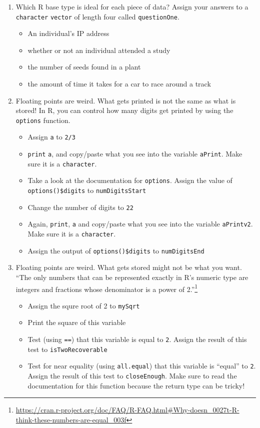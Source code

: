 \documentclass[
  12pt,
  krantz2]{krantz}
\providecommand{\tightlist}{%
  \setlength{\itemsep}{0pt}\setlength{\parskip}{0pt}}
\renewcommand{\href}[2]{#2\footnote{\url{#1}}}
\begin{document}
\begin{enumerate}
\def\labelenumi{\arabic{enumi}.}
\item
  Which R base type is ideal for each piece of data? Assign your answers to a \texttt{character} \texttt{vector} of length four called \texttt{questionOne}.

  \begin{itemize}
  \tightlist
  \item
    An individual's IP address
  \item
    whether or not an individual attended a study
  \item
    the number of seeds found in a plant
  \item
    the amount of time it takes for a car to race around a track
  \end{itemize}
\item
  Floating points are weird. What gets printed is not the same as what is stored! In R, you can control how many digits get printed by using the \texttt{options} function.

  \begin{itemize}
  \tightlist
  \item
    Assign \texttt{a} to \texttt{2/3}
  \item
    \texttt{print} \texttt{a}, and copy/paste what you see into the variable \texttt{aPrint}. Make sure it is a \texttt{character}.
  \item
    Take a look at the documentation for \texttt{options}. Assign the value of \texttt{options()\$digits} to \texttt{numDigitsStart}
  \item
    Change the number of digits to \texttt{22}
  \item
    Again, \texttt{print}, \texttt{a} and copy/paste what you see into the variable \texttt{aPrintv2}. Make sure it is a \texttt{character}.
  \item
    Assign the output of \texttt{options()\$digits} to \texttt{numDigitsEnd}
  \end{itemize}
\item
  Floating points are weird. What gets stored might not be what you want. \href{https://cran.r-project.org/doc/FAQ/R-FAQ.html\#Why-doesn_0027t-R-think-these-numbers-are-equal_003f}{``The only numbers that can be represented exactly in R's numeric type are integers and fractions whose denominator is a power of 2.''}

  \begin{itemize}
  \tightlist
  \item
    Assign the squre root of 2 to \texttt{mySqrt}
  \item
    Print the square of this variable
  \item
    Test (using \texttt{==}) that this variable is equal to \texttt{2}. Assign the result of this test to \texttt{isTwoRecoverable}
  \item
    Test for near equality (using \texttt{all.equal}) that this variable is ``equal'' to \texttt{2}. Assign the result of this test to \texttt{closeEnough}. Make sure to read the documentation for this function because the return type can be tricky!
  \end{itemize}
\end{enumerate}
\end{document}

